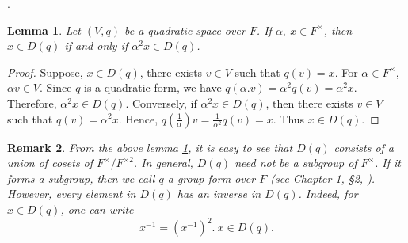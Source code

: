 \documentclass[sn-mathphys-num]{sn-jnl}%
\newtheorem{theorem}{Theorem}[section]
\newtheorem{corollary}[theorem]{Corollary}
\newtheorem{definition}[theorem]{Definition}
\newtheorem{lemma}[theorem]{Lemma}
\newtheorem{remark}[theorem]{Remark}
\begin{document}
.  

    \begin{lemma}\label{square class}
        Let $(V,q)$ be a quadratic space over $F$. If $\alpha,\ x \in F^\times$, then $x \in D(q)$ if and only if $\alpha^2 x \in D(q)$.
    \end{lemma}
    \begin{proof}
        Suppose, $x \in D(q)$, there exists $v \in V$ such that $q(v)=x$. For $\alpha \in F^\times$, $\alpha v \in V$. Since $q$ is a quadratic form, we have $q(\alpha.v)= \alpha^2 q(v)= \alpha^2x$. Therefore, $\alpha^2x \in D(q)$.
        Conversely, if $\alpha^2 x \in D(q)$, then there exists $v \in V$ such that $q(v)=\alpha^2x$. Hence, $q(\frac{1}{\alpha})v=\frac{1}{\alpha^2}q(v)=x$. Thus $x\in D(q)$.
    \end{proof}
   \begin{remark} \normalfont
       
   From the above lemma \ref{square class}, it is easy to see that $D(q)$ consists of a union of cosets of $F^\times/F^{\times 2}$. In general, $D(q)$ need not be a subgroup of $F^\times$. If it forms a subgroup, then we call $q$ a {\it group form} over $F$ (see Chapter 1, \S 2, \cite{lam}). However, every element in $D(q)$ has an inverse in $D(q)$. Indeed, for $x \in D(q)$, one can write 
    \[x^{-1}= (x^{-1})^2.\ x \in D(q).\]
     \end{remark}
    
\end{document}
